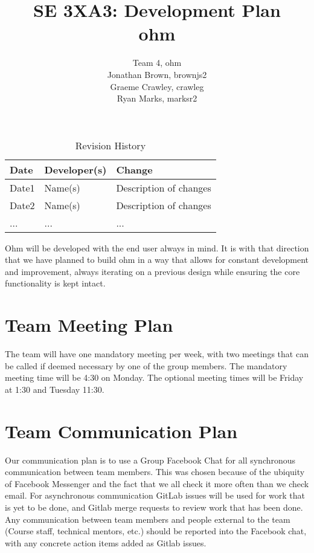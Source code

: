 \documentclass{article}
\title{SE 3XA3: Development Plan \\ohm}
\author{Team 4, ohm
		\\Jonathan Brown, brownjs2
		\\Graeme Crawley, crawleg
		\\Ryan Marks, marksr2
}
\date{}
\begin{document}
\begin{table}[hp]
\caption{Revision History} \label{TblRevisionHistory}
\begin{tabularx}{\textwidth}{llX}
\toprule
\textbf{Date} & \textbf{Developer(s)} & \textbf{Change}\\
\midrule
Date1 & Name(s) & Description of changes\\
Date2 & Name(s) & Description of changes\\
... & ... & ...\\
\bottomrule
\end{tabularx}
\end{table}

\newpage

\maketitle

Ohm will be developed with the end user always in mind. It is with that direction that we have planned to build ohm in a way that allows for constant development and improvement, always iterating on a previous design while ensuring the core functionality is kept intact.

\section{Team Meeting Plan}
The team will have one mandatory meeting per week, with two meetings that can be called if deemed necessary by one of the group members. The mandatory meeting time will be 4:30 on Monday. The optional meeting times will be Friday at 1:30 and Tuesday 11:30.

\section{Team Communication Plan}

Our communication plan is to use a Group Facebook Chat for all synchronous communication between team members.
This was chosen because of the ubiquity of Facebook Messenger and the fact that we all check it more often than we check email.
For asynchronous communication GitLab issues will be used for work that is yet to be done, and Gitlab merge requests to review work that has been done.
Any communication between team members and people external to the team (Course staff, technical mentors, etc.) should be reported into the Facebook chat, 
with any concrete action items added as Gitlab issues.
\end{document}
